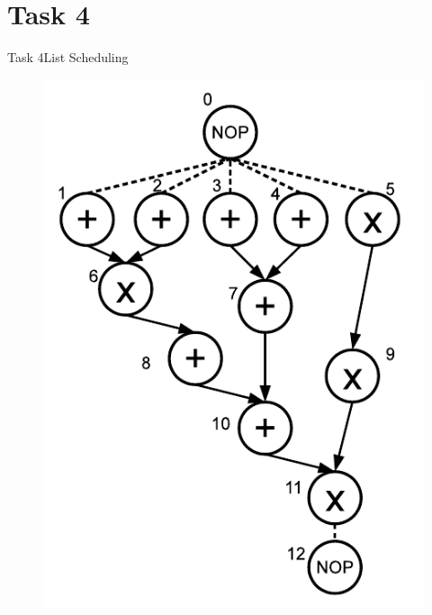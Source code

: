 
\section{Task 4}

\setcounter{task}{1}

\begin{frame}[allowframebreaks]{Task 4}{List Scheduling}
  \begin{tasknoinc}
    \begin{figure}
      \centering
      \includegraphics[height=0.6\paperheight]{./figures/task4_sequence_graph.png}
    \end{figure}
  \end{tasknoinc}
  \framebreak
  \begin{solutionnoinc}
    \begin{figure}
      \centering

\end{figure}
\end{solutionnoinc}
\end{frame}
